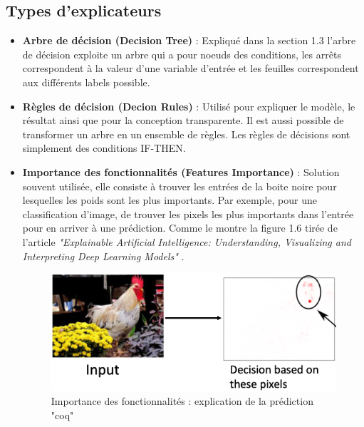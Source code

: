 \subsection{Types d'explicateurs}
\begin{itemize}
    \item \textbf{Arbre de décision (Decision Tree)} : Expliqué dans la section 1.3 l'arbre de décision exploite un arbre qui a pour noeuds des conditions, les arrêts correspondent à la valeur d’une variable d’entrée et les feuilles correspondent aux différents labels possible. 
    
    \item \textbf{Règles de décision (Decion Rules)} : Utilisé pour expliquer le modèle, le résultat ainsi que pour la conception transparente. Il est aussi possible de transformer un arbre en un ensemble de règles. Les règles de décisions sont simplement des conditions IF-THEN.
    
    \item \textbf{Importance des fonctionnalités (Features Importance)} : Solution souvent utilisée, elle consiste à trouver les entrées de la boite noire pour lesquelles les poids sont les plus importants. Par exemple, pour une classification d'image, de trouver les pixels les plus importants dans l'entrée pour en arriver à une prédiction. Comme le montre la figure 1.6 tirée de l'article \textit{"Explainable Artificial Intelligence: Understanding, Visualizing and Interpreting Deep Learning Models"} \cite{explainingIA}.\\
    \begin{figure}[h]
        \centering
        \includegraphics[scale=0.35]{src_img/chickenPixel.png}
        \caption{Importance des fonctionnalités : explication de la prédiction "coq"}
        \label{chickenPixel}
    \end{figure}
    

\end{itemize}
